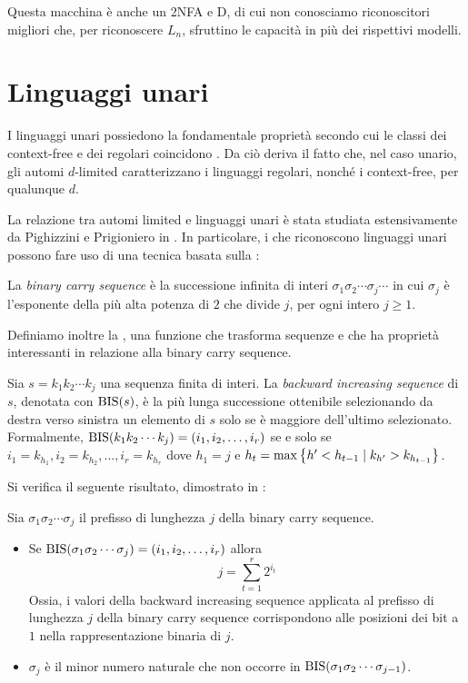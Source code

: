 Questa macchina è anche un 2NFA e D, di cui non conosciamo riconoscitori migliori che, per riconoscere $L_n$, sfruttino le capacità in più dei rispettivi modelli.



\section{Linguaggi unari}\label{sec:wit:un}
I linguaggi unari possiedono la fondamentale proprietà secondo cui le classi dei context-free e dei regolari coincidono \cite{Ginsburg:62:unary}. Da ciò deriva il fatto che, nel caso unario, gli automi $d$-limited caratterizzano i linguaggi regolari, nonché i context-free, per qualunque $d$.

La relazione tra automi limited e linguaggi unari è stata studiata estensivamente da Pighizzini e Prigioniero in \cite{Pighizzini:19:limitedunary}. In particolare, i  che riconoscono linguaggi unari possono fare uso di una tecnica basata sulla :
\begin{defin}
	La \emph{binary carry sequence} è la successione infinita di interi $\sigma_1\sigma_2\cdots\sigma_j\cdots$ in cui $\sigma_j$ è l'esponente della più alta potenza di $2$ che divide $j$, per ogni intero $j\geq1$.
\end{defin}

Definiamo inoltre la , una funzione che trasforma sequenze e che ha proprietà interessanti in relazione alla binary carry sequence.
\begin{defin}
	Sia $s=k_1k_2\cdots k_j$ una sequenza finita di interi. La \emph{backward increasing sequence} di $s$, denotata con $\mathrm{BIS}(s)$, è la più lunga successione ottenibile selezionando da destra verso sinistra un elemento di $s$ solo se è maggiore dell'ultimo selezionato. Formalmente, $\mathrm{BIS}(k_1k_2\cdots k_j)=(i_1,i_2,\dots,i_r)$ se e solo se $i_1=k_{h_1},i_2=k_{h_2},\dots,i_r=k_{h_r}$ dove $h_1=j$ e $h_t=\max\left\{ h'<h_{t-1}\mid k_{h'}>k_{h_{t-1}} \right\}$.
\end{defin}

Si verifica il seguente risultato, dimostrato in \cite{Pighizzini:19:limitedunary}:
\begin{lemma}\label{lem:wit:bis}
	Sia $\sigma_1\sigma_2\cdots\sigma_j$ il prefisso di lunghezza $j$ della binary carry sequence.
	\begin{itemize}
		\item \label{lem:wit:bis:1} Se $\mathrm{BIS}(\sigma_1\sigma_2\cdots\sigma_j)=(i_1,i_2,\dots,i_r)$ allora
		      \begin{equation*}
			      j=\sum_{t=1}^r 2^{i_t}
		      \end{equation*}
		      Ossia, i valori della backward increasing sequence applicata al prefisso di lunghezza $j$ della binary carry sequence corrispondono alle posizioni dei bit a $1$ nella rappresentazione binaria di $j$.
		\item \label{lem:wit:bis:2} $\sigma_j$ è il minor numero naturale che non occorre in $\mathrm{BIS}(\sigma_1\sigma_2\cdots\sigma_{j-1})$.
	\end{itemize}
\end{lemma}


